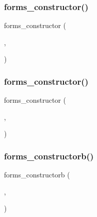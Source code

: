 \mbox{\label{forms_8_h_aee21f47b4714e0edb0625f8df5fe05ca}} 
\subsubsection{\texorpdfstring{forms\+\_\+constructor()}{forms\_constructor()}\hspace{0.1cm}{\footnotesize\ttfamily [9/10]}}
{\footnotesize\ttfamily forms\+\_\+constructor (\begin{DoxyParamCaption}\item[{\hyperlink{class_fl___positioner}{Fl\+\_\+\+Positioner}}]{,  }\item[{fl\+\_\+add\+\_\+positioner}]{ }\end{DoxyParamCaption})}

\mbox{\label{forms_8_h_a78f97791090442a83b962429f17e8b07}} 
\subsubsection{\texorpdfstring{forms\+\_\+constructor()}{forms\_constructor()}\hspace{0.1cm}{\footnotesize\ttfamily [10/10]}}
{\footnotesize\ttfamily forms\+\_\+constructor (\begin{DoxyParamCaption}\item[{\hyperlink{class_fl___value___slider}{Fl\+\_\+\+Value\+\_\+\+Slider}}]{,  }\item[{fl\+\_\+add\+\_\+valslider}]{ }\end{DoxyParamCaption})}

\mbox{\label{forms_8_h_aef2c9bde7867d09bb46868ad5b80d775}} 
\subsubsection{\texorpdfstring{forms\+\_\+constructorb()}{forms\_constructorb()}\hspace{0.1cm}{\footnotesize\ttfamily [1/4]}}
{\footnotesize\ttfamily forms\+\_\+constructorb (\begin{DoxyParamCaption}\item[{\hyperlink{class_fl___forms_bitmap}{Fl\+\_\+\+Forms\+Bitmap}}]{,  }\item[{fl\+\_\+add\+\_\+bitmap}]{ }\end{DoxyParamCaption})}

